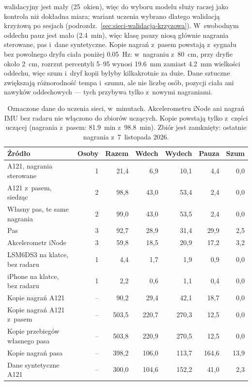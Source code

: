 \documentclass[12pt,a4paper,oneside]{report}
\begin{document}
walidacyjny jest mały (25~okien), więc do wyboru modelu służy raczej jako kontrola niż
dokładna miara; wariant uczenia wybrano dlatego walidacją krzyżową po sesjach
(podrozdz.~\ref{sec:sieci-walidacja-krzyzowa}). W~swobodnym oddechu pauz jest mało (\SI{2.4}{min}), więc klasę
pauzy niosą głównie nagrania sterowane, pas \cite{szymanski2025} i~dane syntetyczne. Kopie nagrań z~pasem powstają z~sygnału bez
powolnego dryfu ciała poniżej \SI{0.05}{Hz}: w~nagraniu z~\SI{80}{cm}, przy
dryfie około \SI{2}{cm}, rozrzut percentyli 5--95 wynosi \SI{19.6}{mm} zamiast
\SI{4.2}{mm} wielkości oddechu, więc szum i~dryf kopii byłyby kilkakrotnie za duże. Dane sztuczne zwiększają
różnorodność tempa i~szumu, ale nie liczbę osób, pozycji ciała ani nawyków
oddechowych --- tych przybywa tylko z~nowymi nagraniami.

\begin{table}[H]
\centering
\small
\caption{Oznaczone dane do uczenia sieci, w~minutach. Akcelerometru iNode ani nagrań IMU bez
radaru nie włączono do zbiorów uczących. Kopie powstają tylko z~części uczącej
(nagrania z~pasem: \SI{81.9}{min} z~\SI{98.8}{min}). Zbiór jest zamknięty: ostatnie
nagrania z~7~listopada 2026.}
\label{tab:fazy-dane}
\setlength{\tabcolsep}{4pt}
\begin{tabular}{@{}lrrrrrr@{}}
\toprule
Źródło & Osoby & Razem & Wdech & Wydech & Pauza & Szum \\
\midrule
A121, nagrania sterowane & 1 & 21,4 & 6,9 & 10,1 & 4,4 & 0,0 \\
A121 z~pasem, siedząc & 2 & 98,8 & 43,0 & 53,4 & 2,4 & 0,0 \\
Własny pas, te same nagrania & 2 & 99,0 & 43,0 & 53,5 & 2,4 & 0,0 \\
Pas \cite{szymanski2025} & 3 & 92,7 & 28,9 & 31,4 & 29,9 & 2,5 \\
Akcelerometr iNode \cite{szymanski2025} & 3 & 59,8 & 18,5 & 20,9 & 17,2 & 3,2 \\
LSM6DS3 na klatce, bez radaru & 1 & 4,4 & 1,7 & 1,9 & 0,9 & 0,0 \\
iPhone na klatce, bez radaru & 1 & 2,2 & 0,6 & 1,1 & 0,4 & 0,0 \\
\midrule
Kopie nagrań A121 & -- & 90,2 & 29,4 & 42,1 & 18,7 & 0,0 \\
Kopie nagrań A121 z~pasem & -- & 503,5 & 220,7 & 270,3 & 12,5 & 0,0 \\
Kopie przebiegów własnego pasa & -- & 503,8 & 220,9 & 270,5 & 12,5 & 0,0 \\
Kopie nagrań pasa & -- & 398,2 & 106,0 & 113,7 & 164,6 & 13,9 \\
Dane syntetyczne A121 & -- & 300,0 & 104,6 & 152,2 & 41,0 & 2,3 \\
\bottomrule
\end{tabular}
\end{table}
\end{document}
